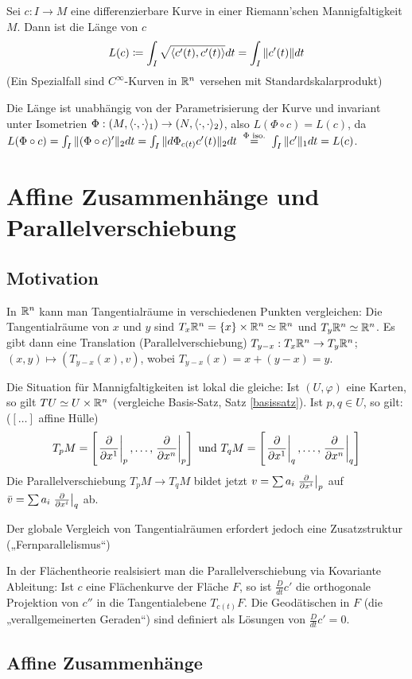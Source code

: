 \documentclass[a4paper,twoside,DIV15,BCOR12mm]{scrbook}
\renewcommand{\da}{\coloneqq}
\begin{document}
Sei $c: I \to M$ eine differenzierbare Kurve in einer Riemann’schen Mannigfaltigkeit $M$. Dann ist die Länge von $c$
\[
L(c) \da \int_I \sqrt{\ksp {c'(t)}{c'(t)}}dt  = \int _I \|c'(t)\|dt
\]
(Ein Spezialfall sind $C^\infty$-Kurven in $\mathbb{R}^n$ versehen mit Standardskalarprodukt)

Die Länge ist unabhängig von der Parametrisierung der Kurve und invariant unter Isometrien $\Phi : (M,\langle\cdot,\cdot\rangle_1) \to (N,\langle\cdot,\cdot\rangle_2)$, also $L(\Phi \circ c) = L(c)$, da $L(\Phi \circ c) = \int_I\|(\Phi \circ c)'\|_2dt = \int_I\|d\Phi_{c(t)}c'(t)\|_2dt \gleichnach{$\Phi$ iso.} \int_I\|c'\|_1dt = L(c)$.


\chapter{Affine Zusammenhänge und Parallelverschiebung}

\section{Motivation}

In $\mathbb{R}^n$ kann man Tangentialräume in verschiedenen Punkten vergleichen:
Die Tangentialräume von $x$ und $y$ sind $T_x\mathbb{R}^n = \{x\}\times \mathbb{R}^n \simeq \mathbb{R}^n$ und $T_y\mathbb{R}^n \simeq \mathbb{R}^n$. Es gibt dann eine Translation (Parallelverschiebung) $T_{y-x}:T_x\mathbb{R}^n \to T_y\mathbb{R}^n$; $(x,y)\mapsto (T_{y-x}(x), v)$, wobei $T_{y-x}(x) = x + (y-x) = y$.

Die Situation für Mannigfaltigkeiten ist lokal die gleiche: Ist $(U,\varphi)$ eine Karten, so gilt $TU \simeq U\times\mathbb{R}^n$ (vergleiche Basis-Satz, Satz \ref{basissatz}). Ist $p,q\in U$, so gilt: ($[\ldots]$ affine Hülle)
\[ T_pM = \left[ \left.\frac{\partial}{\partial x^{1}}\right|_p,\ldots, \left.\frac{\partial}{\partial x^{n}}\right|_p \right] \text{ und } T_qM = \left[ 
\left.\frac{\partial}{\partial x^{1}}\right|_q ,\ldots, \left.\frac{\partial}{\partial x^{n}}\right|_q
 \right] \]
 Die Parallelverschiebung $T_pM \to T_qM$ bildet jetzt 
$v=\sum a_i \left.\frac{\partial}{\partial x^{i}}\right|_p$ auf $\bar v = \sum a_i \left.\frac{\partial}{\partial x^{i}}\right|_q$ ab.

Der globale Vergleich von Tangentialräumen erfordert jedoch eine Zusatzstruktur („Fernparallelismus“)

In der Flächentheorie realsisiert man die Parallelverschiebung via Kovariante Ableitung: Ist $c$ eine Flächenkurve der Fläche $F$, so ist $\frac D {dt} c'$ die orthogonale Projektion von $c''$  in die Tangentialebene $T_{c(t)}F$. Die Geodätischen in $F$ (die „verallgemeinerten Geraden“) sind definiert als Lösungen von $\frac D {dt} c' = 0$.

\section{Affine Zusammenhänge}
\end{document}
